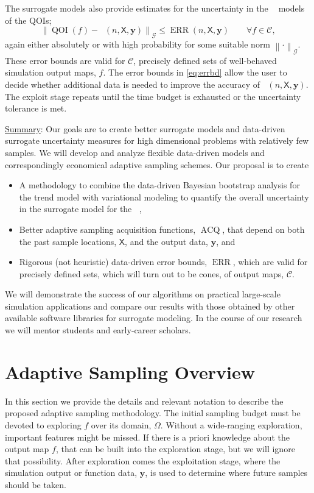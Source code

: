 \documentclass[11pt]{NSFamsart}
\newcommand{\Upara}[1]{\noindent\underline{\upshape #1}:}
\DeclareMathOperator{\QOI}{QOI} %
\DeclareMathOperator{\APP}{\widehat{\QOI}}
\DeclareMathOperator{\ERR}{ERR}
\DeclareMathOperator{\VAL}{ACQ}
\newcommand{\mX}{\mathsf{X}}
\newcommand{\by}{{\boldsymbol{y}}}
\newcommand{\calc}{{\mathcal{C}}}
\newcommand{\calg}{{\mathcal{G}}}
\newcommand{\norm}[2][{}]{\ensuremath{\left \lVert #2 \right \rVert}_{#1}}
\newcommand{\bignorm}[2][{}]{\ensuremath{\bigl \lVert #2 \bigr \rVert}_{#1}}
\begin{document}
The surrogate models also provide estimates for the uncertainty in the $\APP$ models of the QOIs;
\begin{equation} \label{eq:errbd}
    \bignorm[\calg]{\QOI(f) - \APP(n,\mX,\by)} \le \ERR(n,\mX,\by) \qquad \forall f \in \calc,
\end{equation}
again either absolutely or with high probability for some suitable norm $\norm[\calg]{\cdot}$.  These error bounds are valid for $\calc$,  precisely defined sets of well-behaved simulation output maps, $f$. The error bounds in \eqref{eq:errbd} allow the user to decide whether additional data is needed to improve the accuracy of $\APP(n,\mX,\by)$.  The exploit stage repeats until the time budget is exhausted or the uncertainty tolerance is met.

\Upara{Summary} 
Our goals are to create better surrogate models and data-driven surrogate uncertainty measures for high dimensional problems with relatively few samples.   We will develop and analyze flexible data-driven models and correspondingly economical adaptive sampling schemes.  Our proposal is to create
\begin{itemize}
    \item A methodology to combine the data-driven Bayesian bootstrap analysis for the trend model with  variational modeling to quantify the overall uncertainty in the surrogate model for the $\APP$,
    \item Better adaptive sampling acquisition functions, $\VAL$, that depend on both the past sample locations, $\mX$, and the output data, $\by$, and
    \item Rigorous (not heuristic) data-driven error bounds, $\ERR$, which are valid for precisely defined sets, which will turn out to be cones, of output maps, $\calc$.
\end{itemize}
We will demonstrate the success of our algorithms on practical large-scale simulation applications and compare our results with those obtained by other available software libraries for surrogate modeling.  In the course of our research we will mentor students and early-career scholars. 

\section{Adaptive Sampling Overview} \label{sec:overview}
In this section we provide the details and relevant notation to describe the proposed adaptive sampling methodology. The initial sampling budget must be devoted to exploring $f$ over its domain, $\Omega$.  Without a wide-ranging exploration, important features might be missed.  If there is a priori knowledge about the output map $f$, that can be built into the exploration stage, but we will ignore that possibility.  After exploration comes the exploitation stage, where the simulation output or function data, $\by$, is used to determine where future samples should be taken.
\end{document}
